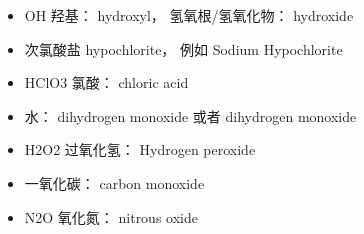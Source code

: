 
\begin{issues}
\issueDraft
\end{issues}

\begin{itemize}
\item OH 羟基： hydroxyl，  氢氧根/氢氧化物： hydroxide
\item 次氯酸盐 hypochlorite， 例如 Sodium Hypochlorite
\item HClO3 氯酸： chloric acid
\item 水： dihydrogen monoxide 或者 dihydrogen monoxide
\item H2O2 过氧化氢： Hydrogen peroxide
\item 一氧化碳： carbon monoxide
\item N2O 氧化氮： nitrous oxide
\end{itemize}
